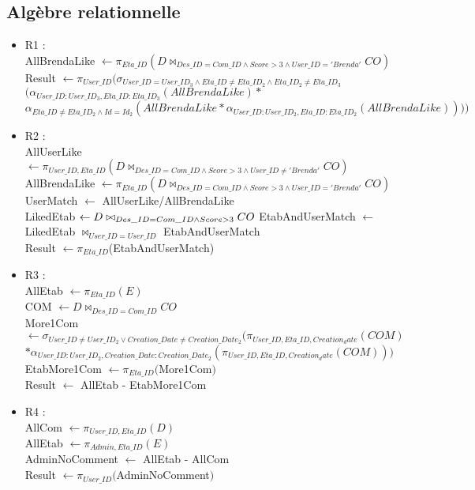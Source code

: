 \subsection{Algèbre relationnelle}
\begin{itemize}
    \item R1 :\\
    AllBrendaLike $\leftarrow \pi_{Eta\_ID} \left(D\bowtie_{Des\_ID=Com\_ID\land Score>3\land User\_ID='Brenda'}CO \right)$\\
    Result $\leftarrow \pi_{User\_ID}\Big(\sigma_{User\_ID=User\_ID_3\land Eta\_ID\neq Eta\_ID_2\land Eta\_ID_2\neq Eta\_ID_3}$\\
    $\big(\alpha_{User\_ID:User\_ID_3,Eta\_ID:Eta\_ID_3}\left(AllBrendaLike\right)*$\\
    $\alpha_{Eta\_ID\neq Eta\_ID_2\land Id=Id_2}\left(AllBrendaLike*\alpha_{User\_ID:User\_ID_2,Eta\_ID:Eta\_ID_2}\left(AllBrendaLike\right)\right)\big)\Big)$
    
    \item R2 :\\
    AllUserLike $\leftarrow \pi_{User\_ID, Eta\_ID} \left( D\bowtie_{Des\_ID=Com\_ID\land Score>3\land User\_ID\ne'Brenda'}CO \right)$\\
    AllBrendaLike $\leftarrow \pi_{Eta\_ID} \left(D\bowtie_{Des\_ID=Com\_ID\land Score>3\land User\_ID='Brenda'}CO \right)$\\
    UserMatch $\leftarrow$ AllUserLike/AllBrendaLike\\
    LikedEtab $\leftarrow D\bowtie_{Des\_ID=Com\_ID\land Score>3}CO\\$
    EtabAndUserMatch $\leftarrow$ LikedEtab $\bowtie_{User\_ID=User\_ID}$ EtabAndUserMatch\\
    Result $\leftarrow \pi_{Eta\_ID}$(EtabAndUserMatch)
    \item R3 :\\
    AllEtab $\leftarrow \pi_{Eta\_ID}(E)$\\
    COM $\leftarrow D\bowtie_{Des\_ID=Com\_ID}CO$\\
    More1Com $\leftarrow \sigma_{User\_ID\ne User\_ID_2\lor Creation\_Date\ne Creation\_Date_2}\Big(\pi_{User\_ID, Eta\_ID, Creation_date}\left(COM\right)$\\
    $*\alpha_{User\_ID:User\_ID_2, Creation\_Date:Creation\_Date_2}\left(\pi_{User\_ID, Eta\_ID, Creation_date}\left(COM\right)\right)\Big)$\\
    EtabMore1Com $\leftarrow \pi_{Eta\_ID}($More1Com$)$\\
    Result $\leftarrow$ AllEtab - EtabMore1Com
    \item R4 :\\
    AllCom $\leftarrow \pi_{User\_ID, Eta\_ID}\left(D\right)$\\
    AllEtab $\leftarrow \pi_{Admin,Eta\_ID}\left(E\right)$\\
    AdminNoComment $\leftarrow$ AllEtab - AllCom\\
    Result $\leftarrow \pi_{User\_ID}($AdminNoComment$)$
\end{itemize}
